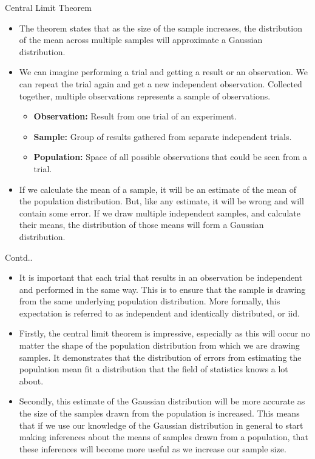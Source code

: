 \documentclass{beamer}
\begin{document}
\begin{frame}{Central Limit Theorem}
	\begin{itemize}
		\item The theorem states that as the size of the sample increases, the distribution of the mean across multiple samples will approximate a Gaussian distribution.
		\item We can imagine performing a trial and getting a result or an observation. We can repeat the trial again and get a new independent observation. Collected together, multiple observations represents a sample of observations.
		\begin{itemize}
			\item \textbf{Observation:} Result from one trial of an experiment.
			\item \textbf{Sample:} Group of results gathered from separate independent trials.
			\item \textbf{Population:} Space of all possible observations that could be seen from a trial.
		\end{itemize}
		\item If we calculate the mean of a sample, it will be an estimate of the mean of the population distribution. But, like any estimate, it will be wrong and will contain some error. If we draw multiple independent samples, and calculate their means, the distribution of those means will form a Gaussian distribution.
	\end{itemize}
\end{frame}

\begin{frame}{Contd..}
	\begin{itemize}
		\item It is important that each trial that results in an observation be independent and performed in the same way. This is to ensure that the sample is drawing from the same underlying population distribution. More formally, this expectation is referred to as independent and identically distributed, or iid.
		\item Firstly, the central limit theorem is impressive, especially as this will occur no matter the shape of the population distribution from which we are drawing samples. It demonstrates that the distribution of errors from estimating the population mean fit a distribution that the field of statistics knows a lot about.
		\item Secondly, this estimate of the Gaussian distribution will be more accurate as the size of the samples drawn from the population is increased. This means that if we use our knowledge of the Gaussian distribution in general to start making inferences about the means of samples drawn from a population, that these inferences will become more useful as we increase our sample size.
	\end{itemize}
\end{frame}
\end{document}
